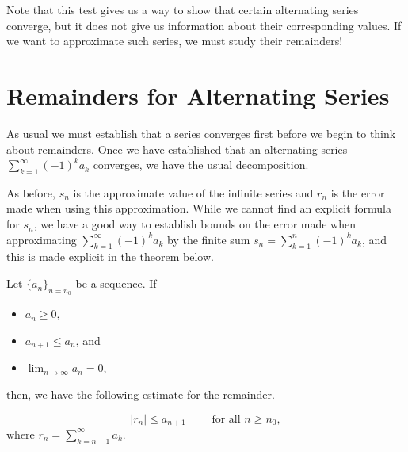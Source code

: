 \documentclass{ximera}
\begin{document}
Note that this test gives us a way to show that certain alternating series converge, but it does not give us information about their corresponding values.  If we want to approximate such series, we must study their remainders!

  



\section{Remainders for Alternating Series}
As usual we must establish that a series converges first before we begin to think about remainders.  Once we have established that an alternating series $\sum_{k=1}^{\infty} (-1)^k a_k$ converges, we have the usual decomposition.

\begin{image}
  \end{image}

As before, $s_n$ is the approximate value of the infinite series and $r_n$ is the error made when using this approximation.  While we cannot find an explicit formula for $s_n$, we have a good way to establish bounds on the error made when approximating $ \sum_{k=1}^{\infty} (-1)^k a_k$ by the finite sum $s_n= \sum_{k=1}^{n} (-1)^k a_k$, and this is made explicit in the theorem below.   

\begin{theorem}
Let $\{a_n\}_{n=n_0}$ be a sequence.  If

\begin{itemize}
\item $a_n \geq 0$,
\item $a_{n+1} \leq a_n$, and
\item $\lim_{n \to\infty} a_n=0$, 
\end{itemize}

then, we have the following estimate for the remainder.

\[
\big| r_n \big| \leq a_{n+1} \qquad \textrm{ for all } n \geq n_0,
\]
where $r_n = \sum_{k=n+1}^{\infty} a_k$.
\end{theorem}
\end{document}
